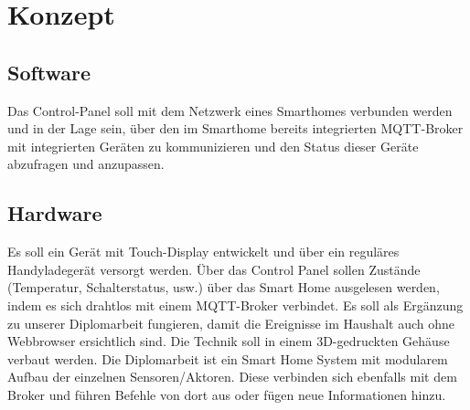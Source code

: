 \chapter{Konzept}
    \section{Software}
        Das Control-Panel soll mit dem Netzwerk eines Smarthomes
        verbunden werden und in der Lage sein, über den im Smarthome 
        bereits integrierten MQTT-Broker mit integrierten Geräten zu 
        kommunizieren und den Status dieser Geräte abzufragen und anzupassen.


    \section{Hardware}
        Es soll ein Gerät mit Touch-Display entwickelt und über ein reguläres 
        Handyladegerät versorgt werden. Über das Control Panel sollen Zustände 
        (Temperatur, Schalterstatus, usw.) über das Smart Home ausgelesen werden, 
        indem es sich drahtlos mit einem MQTT-Broker verbindet. Es soll als 
        Ergänzung zu unserer Diplomarbeit fungieren, damit die Ereignisse im 
        Haushalt auch ohne Webbrowser ersichtlich sind. Die Technik soll in
        einem 3D-gedruckten Gehäuse verbaut werden. Die Diplomarbeit ist ein 
        Smart Home System mit modularem Aufbau der einzelnen Sensoren/Aktoren. 
        Diese verbinden sich ebenfalls mit dem Broker und führen Befehle
        von dort aus oder fügen neue Informationen hinzu.
        
        
